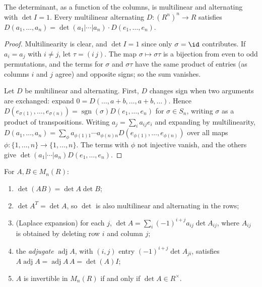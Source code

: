 \begin{theorem}\label{linear-algebra:theorem-determinant}
The determinant, as a function of the columns, is multilinear and alternating with
$\det I = 1$. Every multilinear alternating $D \colon (R^n)^n \to R$ satisfies
$D(a_1, \ldots, a_n) = \det(a_1 | \cdots | a_n) \cdot D(e_1, \ldots, e_n)$.
\end{theorem}

\begin{proof}
Multilinearity is clear, and $\det I = 1$ since only $\sigma = \id$ contributes. If $a_i = a_j$ with
$i \neq j$, let $\tau = (i\,j)$. The map $\sigma \mapsto \sigma\tau$ is a bijection from even to odd permutations,
and the terms for $\sigma$ and $\sigma\tau$ have the same product of entries (as columns $i$ and $j$ agree)
and opposite signs; so the sum vanishes.

Let $D$ be multilinear and alternating. First, $D$ changes sign when two arguments are
exchanged: expand $0 = D(\ldots, a + b, \ldots, a + b, \ldots)$. Hence
$D(e_{\sigma(1)}, \ldots, e_{\sigma(n)}) = \operatorname{sgn}(\sigma) D(e_1, \ldots, e_n)$ for $\sigma \in S_n$, writing $\sigma$ as a
product of transpositions. Writing $a_j = \sum_i a_{ij}e_i$ and expanding by multilinearity,
$D(a_1, \ldots, a_n) = \sum_{\phi} a_{\phi(1)1} \cdots a_{\phi(n)n} D(e_{\phi(1)}, \ldots, e_{\phi(n)})$ over all maps
$\phi \colon \{1, \ldots, n\} \to \{1, \ldots, n\}$. The terms with $\phi$ not injective vanish, and the others give
$\det(a_1|\cdots|a_n) D(e_1, \ldots, e_n)$.
\end{proof}

\begin{proposition}\label{linear-algebra:proposition-determinant-properties}
For $A, B \in M_n(R)$:
\begin{enumerate}
\item $\det(AB) = \det A \det B$;
\item $\det A^T = \det A$, so $\det$ is also multilinear and alternating in the rows;
\item (Laplace expansion) for each $j$, $\det A = \sum_i (-1)^{i+j}a_{ij}\det A_{ij}$, where $A_{ij}$ is
obtained by deleting row $i$ and column $j$;
\item the \emph{adjugate} $\operatorname{adj}A$, with $(i,j)$ entry $(-1)^{i+j}\det A_{ji}$, satisfies
$A \operatorname{adj}A = \operatorname{adj}A \, A = \det(A) I$;
\item $A$ is invertible in $M_n(R)$ if and only if $\det A \in R^\times$.
\end{enumerate}
\end{proposition}


